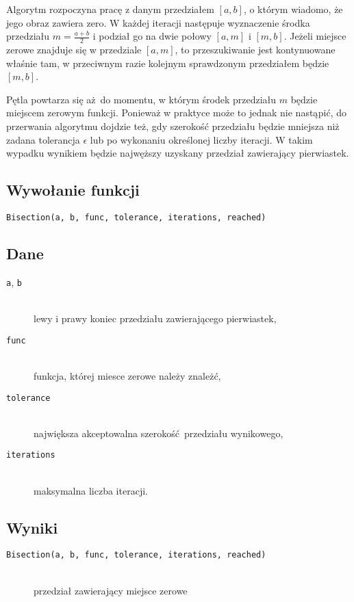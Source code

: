 \documentclass[12pt]{article}
\begin{document}
			Algorytm rozpoczyna pracę z danym przedziałem $[a, b]$,
			o którym wiadomo, że jego obraz zawiera zero.
			W każdej iteracji następuje wyznaczenie środka przedziału $m = \frac{a+b}{2}$
			i podział go na dwie połowy $[a, m]$ i $[m, b]$.
			Jeżeli miejsce zerowe znajduje się w przedziale $[a, m]$, to przeszukiwanie jest kontynuowane
			właśnie tam, w przeciwnym razie kolejnym sprawdzonym przedziałem będzie $[m, b]$.

			Pętla powtarza się aż do momentu, w którym środek przedziału $m$ będzie miejscem zerowym funkcji.
			Ponieważ w praktyce może to jednak nie nastąpić, do przerwania algorytmu dojdzie też,
			gdy szerokość przedziału będzie mniejsza niż zadana tolerancja $\epsilon$
			lub po wykonaniu określonej liczby iteracji.
			W takim wypadku wynikiem będzie najwęższy uzyskany przedział zawierający pierwiastek.

		\subsection{Wywołanie funkcji}
			\texttt{Bisection(a, b, func, tolerance, iterations, reached)}

		\subsection{Dane}
			\begin{description}
				\item[\texttt{a}, \texttt{b}] \hfill\\ lewy i prawy koniec przedziału zawierającego pierwiastek,
				\item[\texttt{func}] \hfill\\ funkcja, której miesce zerowe należy znależć,
				\item[\texttt{tolerance}] \hfill\\ największa akceptowalna szerokość przedziału wynikowego,
				\item[\texttt{iterations}] \hfill\\ maksymalna liczba iteracji.
			\end{description}

		\subsection{Wyniki}
			\begin{description}
				\item[\texttt{Bisection(a, b, func, tolerance, iterations, reached)}] \hfill\\
					przedział zawierający miejsce zerowe
			\end{description}
\end{document}
